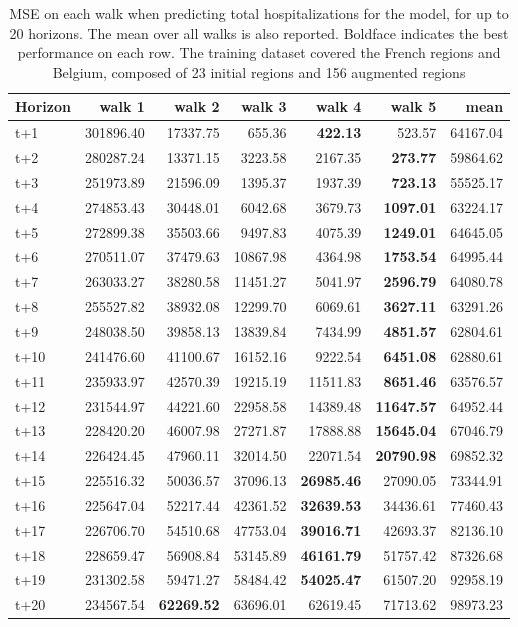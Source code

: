 \begin{table}[H]
\centering
\caption{MSE on each walk when predicting total hospitalizations for the model, for up to 20 horizons. The mean over all walks is also reported. Boldface indicates the best performance on each row. The training dataset covered the French regions and Belgium, composed of 23 initial regions and 156 augmented regions }
\label{tab:MSE_walk_encoder_decoder}
\begin{tabular}{lrrrrrr}
\toprule
Horizon &    walk 1 &   walk 2 &   walk 3 &   walk 4 &   walk 5 &     mean \\
\midrule
t+1  & 301896.40  & 17337.75  & 655.36  & \textbf{422.13}  & 523.57  & 64167.04  \\
t+2  & 280287.24  & 13371.15  & 3223.58  & 2167.35  & \textbf{273.77}  & 59864.62  \\
t+3  & 251973.89  & 21596.09  & 1395.37  & 1937.39  & \textbf{723.13}  & 55525.17  \\
t+4  & 274853.43  & 30448.01  & 6042.68  & 3679.73  & \textbf{1097.01}  & 63224.17  \\
t+5  & 272899.38  & 35503.66  & 9497.83  & 4075.39  & \textbf{1249.01}  & 64645.05  \\
t+6  & 270511.07  & 37479.63  & 10867.98  & 4364.98  & \textbf{1753.54}  & 64995.44  \\
t+7  & 263033.27  & 38280.58  & 11451.27  & 5041.97  & \textbf{2596.79}  & 64080.78  \\
t+8  & 255527.82  & 38932.08  & 12299.70  & 6069.61  & \textbf{3627.11}  & 63291.26  \\
t+9  & 248038.50  & 39858.13  & 13839.84  & 7434.99  & \textbf{4851.57}  & 62804.61  \\
t+10  & 241476.60  & 41100.67  & 16152.16  & 9222.54  & \textbf{6451.08}  & 62880.61  \\
t+11  & 235933.97  & 42570.39  & 19215.19  & 11511.83  & \textbf{8651.46}  & 63576.57  \\
t+12  & 231544.97  & 44221.60  & 22958.58  & 14389.48  & \textbf{11647.57}  & 64952.44  \\
t+13  & 228420.20  & 46007.98  & 27271.87  & 17888.88  & \textbf{15645.04}  & 67046.79  \\
t+14  & 226424.45  & 47960.11  & 32014.50  & 22071.54  & \textbf{20790.98}  & 69852.32  \\
t+15  & 225516.32  & 50036.57  & 37096.13  & \textbf{26985.46}  & 27090.05  & 73344.91  \\
t+16  & 225647.04  & 52217.44  & 42361.52  & \textbf{32639.53}  & 34436.61  & 77460.43  \\
t+17  & 226706.70  & 54510.68  & 47753.04  & \textbf{39016.71}  & 42693.37  & 82136.10  \\
t+18  & 228659.47  & 56908.84  & 53145.89  & \textbf{46161.79}  & 51757.42  & 87326.68  \\
t+19  & 231302.58  & 59471.27  & 58484.42  & \textbf{54025.47}  & 61507.20  & 92958.19  \\
t+20  & 234567.54  & \textbf{62269.52}  & 63696.01  & 62619.45  & 71713.62  & 98973.23  \\

\bottomrule
\end{tabular}
\end{table}
